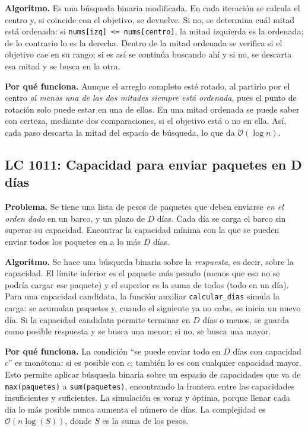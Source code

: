 \documentclass[11pt,letterpaper]{article}
\newcommand{\bigO}[1]{\ensuremath{\mathcal{O}(#1)}}
\begin{document}
\textbf{Algoritmo.} Es una búsqueda binaria modificada. En cada iteración se calcula el centro y, si coincide con el objetivo, se devuelve. Si no, se determina cuál mitad está ordenada: si \texttt{nums[izq] <= nums[centro]}, la mitad izquierda es la ordenada; de lo contrario lo es la derecha. Dentro de la mitad ordenada se verifica si el objetivo cae en su rango; si es así se continúa buscando ahí y si no, se descarta esa mitad y se busca en la otra.

\textbf{Por qué funciona.} Aunque el arreglo completo esté rotado, al partirlo por el centro \emph{al menos una de las dos mitades siempre está ordenada}, pues el punto de rotación solo puede estar en una de ellas. En una mitad ordenada se puede saber con certeza, mediante dos comparaciones, si el objetivo está o no en ella. Así, cada paso descarta la mitad del espacio de búsqueda, lo que da \bigO{\log n}.

\subsection{LC 1011: Capacidad para enviar paquetes en D días}

\textbf{Problema.} Se tiene una lista de pesos de paquetes que deben enviarse \emph{en el orden dado} en un barco, y un plazo de $D$ días. Cada día se carga el barco sin superar su capacidad. Encontrar la capacidad mínima con la que se pueden enviar todos los paquetes en a lo más $D$ días.

\textbf{Algoritmo.} Se hace una búsqueda binaria sobre la \emph{respuesta}, es decir, sobre la capacidad. El límite inferior es el paquete más pesado (menos que eso no se podría cargar ese paquete) y el superior es la suma de todos (todo en un día). Para una capacidad candidata, la función auxiliar \texttt{calcular\_dias} simula la carga: se acumulan paquetes y, cuando el siguiente ya no cabe, se inicia un nuevo día. Si la capacidad candidata permite terminar en $D$ días o menos, se guarda como posible respuesta y se busca una menor; si no, se busca una mayor.

\textbf{Por qué funciona.} La condición ``se puede enviar todo en $D$ días con capacidad $c$'' es monótona: si es posible con $c$, también lo es con cualquier capacidad mayor. Esto permite aplicar búsqueda binaria sobre un espacio de capacidades que va de \texttt{max(paquetes)} a \texttt{sum(paquetes)}, encontrando la frontera entre las capacidades insuficientes y suficientes. La simulación es voraz y óptima, porque llenar cada día lo más posible nunca aumenta el número de días. La complejidad es \bigO{n \log(S)}, donde $S$ es la suma de los pesos.
\end{document}
